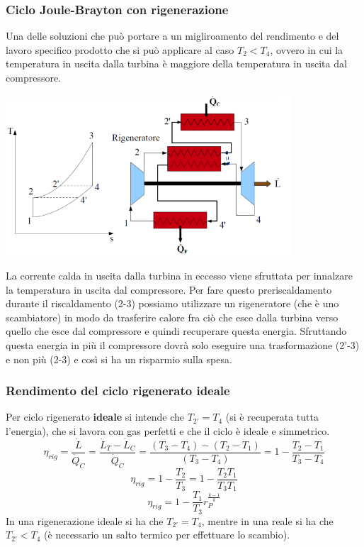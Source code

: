 \subsubsection{Ciclo Joule-Brayton con rigenerazione}
Una delle soluzioni che può portare a un migliroamento del rendimento e del lavoro specifico prodotto che si può applicare al caso $T_2<T_4$, ovvero in cui la temperatura in uscita dalla turbina è maggiore della temperatura in uscita dal compressore.
\begin{center}
    \includegraphics[height=6cm]{../L07/img8.PNG}
\end{center}
La corrente calda in uscita dalla turbina in eccesso viene sfruttata per innalzare la temperatura in uscita dal compressore.\newline
\newline
Per fare questo preriscaldamento durante il riscaldamento (2-3) possiamo utilizzare un rigeneratore (che è uno scambiatore) in modo da trasferire calore fra ciò che esce dalla turbina verso quello che esce dal compressore e quindi recuperare questa energia. Sfruttando questa energia in più il compressore dovrà solo eseguire una trasformazione (2'-3) e non più (2-3) e così si ha un risparmio sulla spesa.\newline
\newline
\subsubsection{Rendimento del ciclo rigenerato ideale}
Per ciclo rigenerato \textbf{ideale} si intende che $T_{2'} = T_4$ (si è recuperata tutta l'energia), che si lavora con gas perfetti e che il ciclo è ideale e simmetrico.
\[
    \eta_{rig} = \frac{\dot{L}}{\dot{Q}_C} = \frac{\dot{L}_T - \dot{L}_C}{\dot{Q}_C} = \frac{(T_3-T_4)-(T_2-T_1)}{(T_3-T_4)} = 1- \frac{T_2-T_1}{T_3-T_4}
\]
\[
    \eta_{rig} = 1- \frac{T_2}{T_3} = 1- \frac{T_2 T_1}{T_3T_1}
\]
\[
    \eta_{rig} = 1- \frac{T_1}{T_3}r_P^{\frac{k-1}{k}}
\]
In una rigenerazione ideale si ha che $T_{2'}=T_4$, mentre in una reale si ha che $T_{2'} < T_4$ (è necessario un salto termico per effettuare lo scambio).

